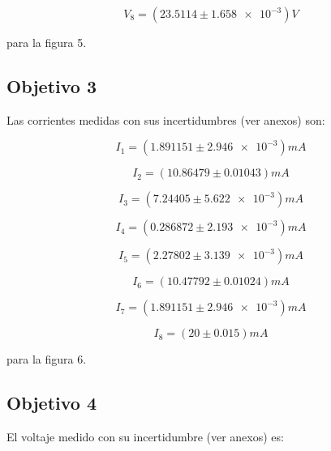 \documentclass[DIV=calc, paper=a4, fontsize=11pt]{scrartcl}
\begin{document}
\begin{multicols}{2}
\begin{equation*}
    V_8 = (23.5114 \pm \num{1.658e-3}) V
\end{equation*}




\noindent para la figura 5. 


\subsection*{Objetivo 3}


Las corrientes medidas con sus incertidumbres (ver anexos) son:

\begin{equation*}
    I_1 = (1.891151 \pm \num{2.946e-3}) mA
\end{equation*}

\begin{equation*}
    I_2 = (10.86479 \pm 0.01043) mA
\end{equation*}

\begin{equation*}
    I_3 = (7.24405 \pm \num{5.622e-3}) mA
\end{equation*}

\begin{equation*}
    I_4 = (0.286872 \pm \num{2.193e-3}) mA 
\end{equation*}

\begin{equation*}
    I_5 = (2.27802 \pm \num{3.139e-3}) mA
\end{equation*}

\begin{equation*}
    I_6 = (10.47792 \pm 0.01024) mA
\end{equation*}

\begin{equation*}
    I_7 = (1.891151 \pm \num{2.946e-3}) mA
\end{equation*}

\begin{equation*}
    I_8 = (20 \pm 0.015) mA
\end{equation*}




\noindent para la figura 6. 

\subsection*{Objetivo 4}

El voltaje medido con su incertidumbre (ver anexos) es:


\end{multicols}
\end{document}
